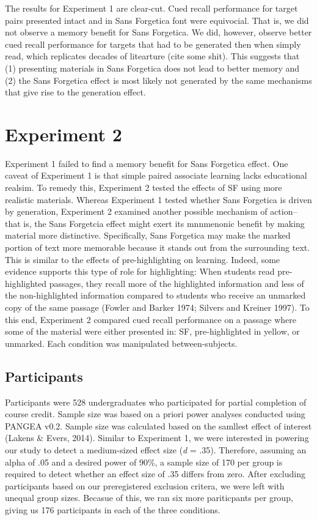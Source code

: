 \documentclass[pdf]{apa6}
\begin{document}
The results for Experiment 1 are clear-cut. Cued recall performance for target pairs presented intact and in Sans Forgetica font were equivocial. That is, we did not observe a memory benefit for Sans Forgetica. We did, however, observe better cued recall performance for targets that had to be generated then when simply read, which replicates decades of litearture (cite some shit). This suggests that (1) presenting materials in Sans Forgetica does not lead to better memory and (2) the Sans Forgetica effect is most likely not generated by the same mechanisms that give rise to the generation effect.

\hypertarget{experiment-2}{%
\section{Experiment 2}\label{experiment-2}}

Experiment 1 failed to find a memory benefit for Sans Forgetica effect. One caveat of Experiment 1 is that simple paired associate learning lacks educational realsim. To remedy this, Experiment 2 tested the effects of SF using more realistic materials. Whereas Experiment 1 tested whether Sans Forgetica is driven by generation, Experiment 2 examined another possible mechanism of action--that is, the Sans Forgetcia effect might exert its mnnmenonic benefit by making material more distinctive. Specifically, Sans Forgetica may make the marked portion of text more memorable because it stands out from the surrounding text. This is similar to the effects of pre-highlighting on learning. Indeed, some evidence supports this type of role for highlighting: When students read pre-highlighted passages, they recall more of the highlighted information and less of the non-highlighted information compared to students who receive an unmarked copy of the same passage (Fowler and Barker 1974; Silvers and Kreiner 1997). To this end, Experiment 2 compared cued recall performance on a passage where some of the material were either presented in: SF, pre-highlighted in yellow, or unmarked. Each condition was manipulated between-subjects.

\hypertarget{participants-1}{%
\subsection{Participants}\label{participants-1}}

Participants were 528 undergraduates who participated for partial completion of course credit. Sample size was based on a priori power analyses conducted using PANGEA v0.2. Sample size was calculated based on the samllest effect of interest (Lakens \& Evers, 2014). Similar to Experiment 1, we were interested in powering our study to detect a medium-sized effect size (\emph{d} = .35). Therefore, assuming an alpha of .05 and a desired power of 90\%, a sample size of 170 per group is required to detect whether an effect size of .35 differs from zero. After excluding participants based on our preregistered exclusion critera, we were left with unequal group sizes. Becasue of this, we ran six more pariticpants per group, giving us 176 participants in each of the three conditions.
\end{document}
